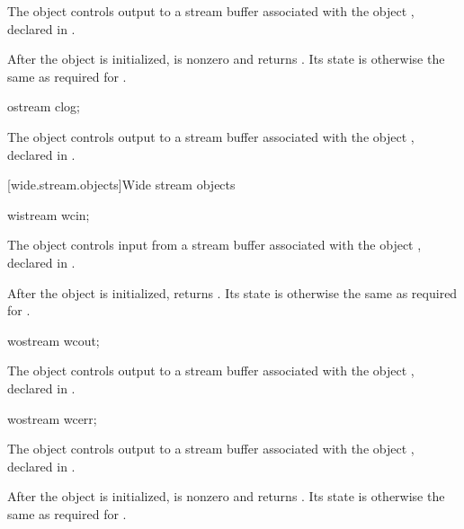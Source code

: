 \begin{itemdescr}
\pnum
The object 
controls output to a stream buffer associated with the object ,
declared in .

\pnum
After the object
is initialized,
is nonzero and  returns .
Its state is otherwise the same as required for
.
\end{itemdescr}

%
\begin{itemdecl}
ostream clog;
\end{itemdecl}

\begin{itemdescr}
\pnum
The object 
controls output to a stream buffer
associated with the object ,
declared in .
\end{itemdescr}

[wide.stream.objects]{Wide stream objects}

%
\begin{itemdecl}
wistream wcin;
\end{itemdecl}

\begin{itemdescr}
\pnum
The object 
controls input from a stream buffer associated with the object ,
declared in .

\pnum
After the object
is initialized,
returns
.
Its state is otherwise the same as required for
.
\end{itemdescr}

%
\begin{itemdecl}
wostream wcout;
\end{itemdecl}

\begin{itemdescr}
\pnum
The object 
controls output to a stream buffer associated with the object ,
declared in .
\end{itemdescr}

%
\begin{itemdecl}
wostream wcerr;
\end{itemdecl}

\begin{itemdescr}
\pnum
The object 
controls output to a stream buffer associated with the object ,
declared in .

\pnum
After the object
is initialized,
is nonzero and  returns .
Its state is otherwise the same as required for
.
\end{itemdescr}

